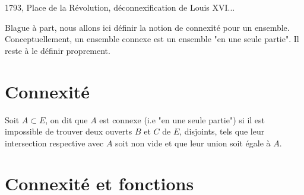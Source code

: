 
\minitoc  %

1793, Place de la Révolution, déconnexification de Louis XVI... 

\vspace{0.3cm}

Blague à part, nous allons ici définir la notion de connexité pour un ensemble. 
Conceptuellement, un ensemble connexe est un ensemble "en une seule partie". 
Il reste à le définir proprement. 


\section{Connexité}

\begin{definition}[Connexité]
    Soit $A \subset E$, on dit que $A$ est connexe (i.e "en une seule partie") si il est impossible de trouver 
    deux ouverts $B$ et $C$ de $E$, disjoints, tels que leur intersection respective avec $A$ soit non vide 
    et que leur union soit égale à $A$. 
\end{definition}






\section{Connexité et fonctions}
